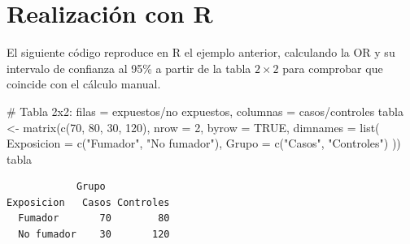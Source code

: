 \documentclass[
  spanish,
  a4paper,
]{scrreport}
\newenvironment{Shaded}{\begin{snugshade}}{\end{snugshade}}
\newcommand{\AttributeTok}[1]{\textcolor[rgb]{0.40,0.45,0.13}{#1}}
\newcommand{\CommentTok}[1]{\textcolor[rgb]{0.37,0.37,0.37}{#1}}
\newcommand{\ConstantTok}[1]{\textcolor[rgb]{0.56,0.35,0.01}{#1}}
\newcommand{\DecValTok}[1]{\textcolor[rgb]{0.68,0.00,0.00}{#1}}
\newcommand{\FunctionTok}[1]{\textcolor[rgb]{0.28,0.35,0.67}{#1}}
\newcommand{\NormalTok}[1]{\textcolor[rgb]{0.00,0.23,0.31}{#1}}
\newcommand{\OtherTok}[1]{\textcolor[rgb]{0.00,0.23,0.31}{#1}}
\newcommand{\StringTok}[1]{\textcolor[rgb]{0.13,0.47,0.30}{#1}}
\theoremstyle{definition}
\theoremstyle{definition}
\theoremstyle{remark}
\begin{document}
\section{Realización con R}\label{realizaciuxf3n-con-r-3}

El siguiente código reproduce en R el ejemplo anterior, calculando la OR
y su intervalo de confianza al 95\% a partir de la tabla \(2\times 2\)
para comprobar que coincide con el cálculo manual.

\begin{Shaded}
\begin{Highlighting}[]
\CommentTok{\# Tabla 2x2: filas = expuestos/no expuestos, columnas = casos/controles}
\NormalTok{tabla }\OtherTok{\textless{}{-}} \FunctionTok{matrix}\NormalTok{(}\FunctionTok{c}\NormalTok{(}\DecValTok{70}\NormalTok{, }\DecValTok{80}\NormalTok{, }\DecValTok{30}\NormalTok{, }\DecValTok{120}\NormalTok{),}
                \AttributeTok{nrow =} \DecValTok{2}\NormalTok{, }\AttributeTok{byrow =} \ConstantTok{TRUE}\NormalTok{,}
                \AttributeTok{dimnames =} \FunctionTok{list}\NormalTok{(}
                  \AttributeTok{Exposicion =} \FunctionTok{c}\NormalTok{(}\StringTok{"Fumador"}\NormalTok{, }\StringTok{"No fumador"}\NormalTok{),}
                  \AttributeTok{Grupo =} \FunctionTok{c}\NormalTok{(}\StringTok{"Casos"}\NormalTok{, }\StringTok{"Controles"}\NormalTok{)}
\NormalTok{                ))}
\NormalTok{tabla}
\end{Highlighting}
\end{Shaded}

\begin{verbatim}
            Grupo
Exposicion   Casos Controles
  Fumador       70        80
  No fumador    30       120
\end{verbatim}
\end{document}
